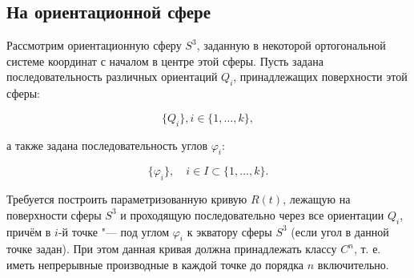 \subsection*{На ориентационной сфере}

Рассмотрим ориентационную сферу $S^3$, заданную в некоторой ортогональной сис\-теме координат с началом в центре этой
сферы. Пусть задана последовательность различных ориентаций $Q_i$, принадлежащих поверхности этой сферы:

$$\{Q_i\}, i \in \{1, \dots, k\},$$

\noindent а также задана последовательность углов $\varphi_i$:

$$\{\varphi_i\}, \quad i \in I \subset \{1, \dots, k\}.$$

Требуется построить параметризованную кривую $R(t)$, лежащую на поверхности сферы $S^3$ и проходящую
последовательно через все ориентации $Q_i$, причём в $i$-й точке "--- под углом $\varphi_i$ к экватору сферы $S^3$ (если
угол в данной точке задан). При этом данная кривая должна принадлежать классу $C^n$, т. е. иметь непрерывные
производные в каждой точке до порядка $n$ включительно.
